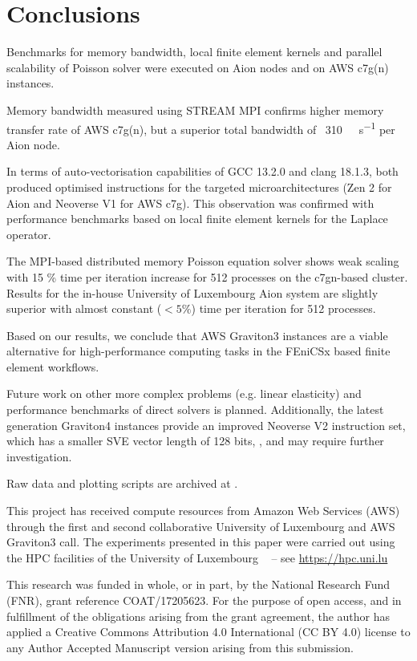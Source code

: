 \section*{Conclusions}

Benchmarks for memory bandwidth, local finite element kernels and parallel
scalability of Poisson solver were executed on Aion nodes and on AWS c7g(n)
instances.

Memory bandwidth measured using STREAM MPI confirms higher memory transfer rate
of AWS c7g(n), but a superior total bandwidth of
~\SI{310}{\giga\byte\per\second} per Aion node.

In terms of auto-vectorisation capabilities of GCC 13.2.0 and clang 18.1.3, both
produced optimised instructions for the targeted microarchitectures (Zen 2 for
Aion and Neoverse V1 for AWS c7g). This observation was confirmed with
performance benchmarks based on local finite element kernels for the Laplace
operator.

The MPI-based distributed memory Poisson equation solver shows weak scaling with
15 \% time per iteration increase for 512 processes on the c7gn-based cluster.
Results for the in-house University of Luxembourg Aion system are slightly
superior with almost constant ($< 5 \%$) time per iteration for 512 processes.

Based on our results, we conclude that AWS Graviton3 instances are a viable
alternative for high-performance computing tasks in the FEniCSx based finite
element workflows.

Future work on other more complex problems (e.g. linear elasticity) and
performance benchmarks of direct solvers is planned. Additionally, the latest
generation Graviton4 instances provide an improved Neoverse V2 instruction set,
which has a smaller SVE vector length of 128 bits,
\citep{ArmReferenceManualNeoverseV2}, and may require further investigation.

\begin{acknowledgement}
Raw data and plotting scripts are archived at \citep{habera_2024_13748405}.

This project has received compute resources from Amazon Web Services (AWS)
through the first and second collaborative University of Luxembourg and
AWS Graviton3 call. The experiments presented in this paper were
carried out using the HPC facilities of the University of Luxembourg
~\cite{VCPKVO_HPCCT22} {\small -- see \url{https://hpc.uni.lu}}

This research was funded in whole, or in part, by the National Research
Fund (FNR), grant reference COAT/17205623. For the purpose of open
access, and in fulfillment of the obligations arising from the grant
agreement, the author has applied a Creative Commons Attribution 4.0
International (CC BY 4.0) license to any Author Accepted Manuscript
version arising from this submission.
\end{acknowledgement}



